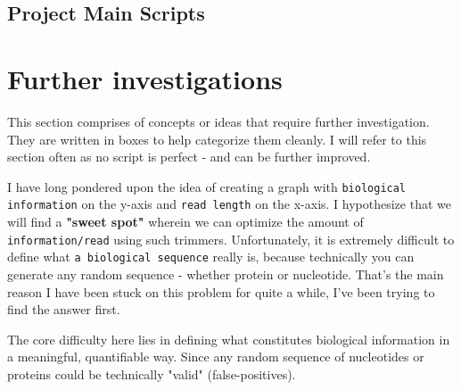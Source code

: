 \documentclass[11pt]{report}
\begin{document}
{\newpage

\pagestyle{fancy}
\fancyhf{}
\fancyhead[C]{\leftmark}  %
\fancyhead[R]{\thepage}




\chapter{Project Main Scripts}

\setcounter{section}{0}
\setcounter{subsection}{0}

\linenumbers*
\section{}
\setcounter{section}{1}
\setcounter{subsection}{0}


\newpage
\pagestyle{fancy}
\fancyhf{}
\fancyhead[C]{\leftmark}  %
\fancyhead[R]{\thepage}

\part{Further investigations}

\renewcommand{\thesection}{\arabic{section}}
\setcounter{section}{0}
\setcounter{subsection}{0}

This section comprises of concepts or ideas that require further investigation. They are written in boxes to help categorize them cleanly. I will refer to this section often as no script is perfect - and can be further improved. 

\begin{tcolorbox}[colback=gray!10!white, coltitle=white, colframe=gray!80!black, title=Biological Information]
	I have long pondered upon the idea of creating a graph with \texttt{biological information} on the y-axis and \texttt{read length} on the x-axis. I hypothesize that we will find a \textbf{"sweet spot" }wherein we can optimize the amount of \texttt{information/read} using such trimmers. Unfortunately, it is extremely difficult to define what \texttt{a biological sequence} really is, because technically you can generate any random sequence - whether protein or nucleotide. That's the main reason I have been stuck on this problem for quite a while, I've been trying to find the answer first.
	
	The core difficulty here lies in defining what constitutes biological information in a meaningful, quantifiable way. Since any random sequence of nucleotides or proteins could be technically "valid" (false-positives). 
	

\end{tcolorbox}}
\end{document}
